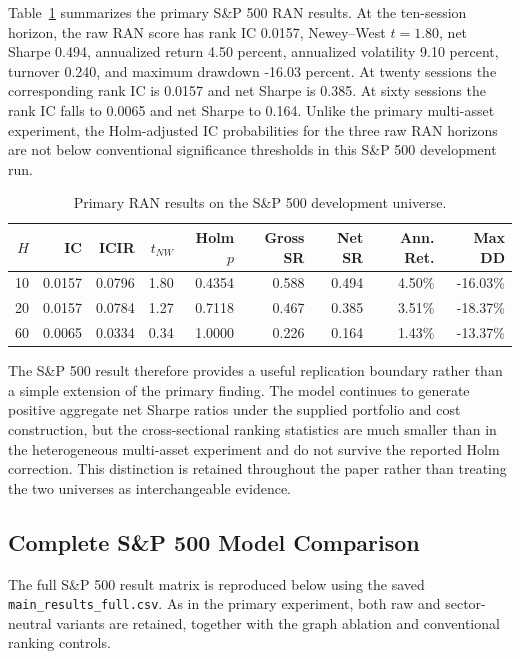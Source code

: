 \documentclass[10pt]{article}
\begin{document}
Table~\ref{tab:sp500summary} summarizes the primary S\&P 500 RAN results. At the ten-session horizon, the raw RAN score has rank IC 0.0157, Newey--West $t=1.80$, net Sharpe 0.494, annualized return 4.50 percent, annualized volatility 9.10 percent, turnover 0.240, and maximum drawdown -16.03 percent. At twenty sessions the corresponding rank IC is 0.0157 and net Sharpe is 0.385. At sixty sessions the rank IC falls to 0.0065 and net Sharpe to 0.164. Unlike the primary multi-asset experiment, the Holm-adjusted IC probabilities for the three raw RAN horizons are not below conventional significance thresholds in this S\&P 500 development run.

\begin{table}[tbp]
\centering\small
\caption{Primary RAN results on the S\&P 500 development universe.}
\label{tab:sp500summary}
\begin{tabular}{rrrrrrrrr}
\toprule
$H$ & IC & ICIR & $t_{NW}$ & Holm $p$ & Gross SR & Net SR & Ann. Ret. & Max DD\\
\midrule
10 & 0.0157 & 0.0796 & 1.80 & 0.4354 & 0.588 & 0.494 & 4.50\% & -16.03\%\\
20 & 0.0157 & 0.0784 & 1.27 & 0.7118 & 0.467 & 0.385 & 3.51\% & -18.37\%\\
60 & 0.0065 & 0.0334 & 0.34 & 1.0000 & 0.226 & 0.164 & 1.43\% & -13.37\%\\
\bottomrule
\end{tabular}
\end{table}

The S\&P 500 result therefore provides a useful replication boundary rather than a simple extension of the primary finding. The model continues to generate positive aggregate net Sharpe ratios under the supplied portfolio and cost construction, but the cross-sectional ranking statistics are much smaller than in the heterogeneous multi-asset experiment and do not survive the reported Holm correction. This distinction is retained throughout the paper rather than treating the two universes as interchangeable evidence.

\subsection{Complete S\&P 500 Model Comparison}

The full S\&P 500 result matrix is reproduced below using the saved \texttt{main\_results\_full.csv}. As in the primary experiment, both raw and sector-neutral variants are retained, together with the graph ablation and conventional ranking controls.
\end{document}
